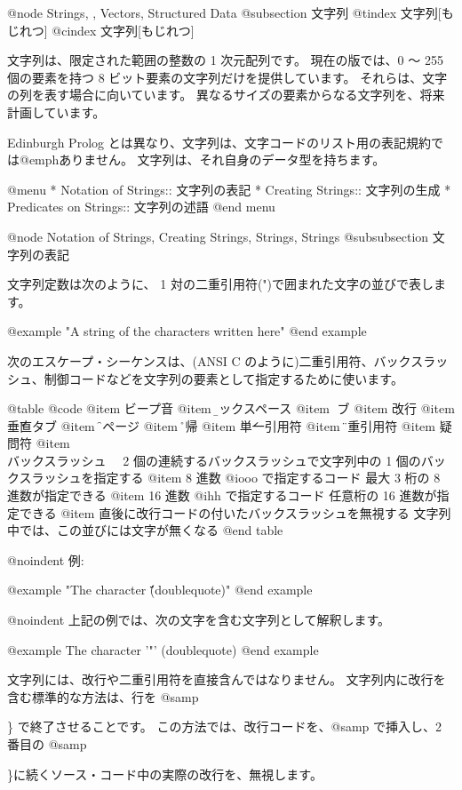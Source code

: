{{@node Strings,  , Vectors, Structured Data
@subsection 文字列
@tindex 文字列[もじれつ]
@cindex 文字列[もじれつ]

文字列は、限定された範囲の整数の 1 次元配列です。
現在の版では、0 〜 255 個の要素を持つ 8 ビット要素の文字列だけを提供しています。
それらは、文字の列を表す場合に向いています。
異なるサイズの要素からなる文字列を、将来計画しています。

Edinburgh Prolog とは異なり、文字列は、文字コードのリスト用の表記規約では@emph{ありません}。
文字列は、それ自身のデータ型を持ちます。

@menu
* Notation of Strings::         文字列の表記
* Creating Strings::            文字列の生成
* Predicates on Strings::       文字列の述語
@end menu

@node Notation of Strings, Creating Strings, Strings, Strings
@subsubsection 文字列の表記

文字列定数は次のように、 1 対の二重引用符(")で囲まれた文字の並びで表します。

@example
"A string of the characters written here"
@end example

次のエスケープ・シーケンスは、(ANSI C のように)二重引用符、バックスラッシュ、制御コードなどを文字列の要素として指定するために使います。

@table @code
@item \a
ビープ音
@item \b
バックスペース
@item \t
タブ
@item \n
改行
@item \v
垂直タブ
@item \f
改ページ
@item \r
復帰
@item \'
単一引用符
@item \"
二重引用符
@item \?
疑問符
@item \\
バックスラッシュ　
 2 個の連続するバックスラッシュで文字列中の 1 個のバックスラッシュを指定する
@item 
 8 進数 @i{ooo} で指定するコード
最大 3 桁の 8 進数が指定できる
@item 
 16 進数 @i{hh} で指定するコード
任意桁の 16 進数が指定できる
@item 
直後に改行コードの付いたバックスラッシュを無視する
文字列中では、この並びには文字が無くなる
@end table

@noindent
例:

@example
"The character \'\"\' (doublequote)"
@end example

@noindent
上記の例では、次の文字を含む文字列として解釈します。

@example
The character '"' (doublequote)
@end example

文字列には、改行や二重引用符を直接含んではなりません。
文字列内に改行を含む標準的な方法は、行を @samp{\n\} で終了させることです。
この方法では、改行コードを、@samp{\n} で挿入し、2 番目の @samp{\}に続くソース・コード中の実際の改行を、無視します。

}}}}
